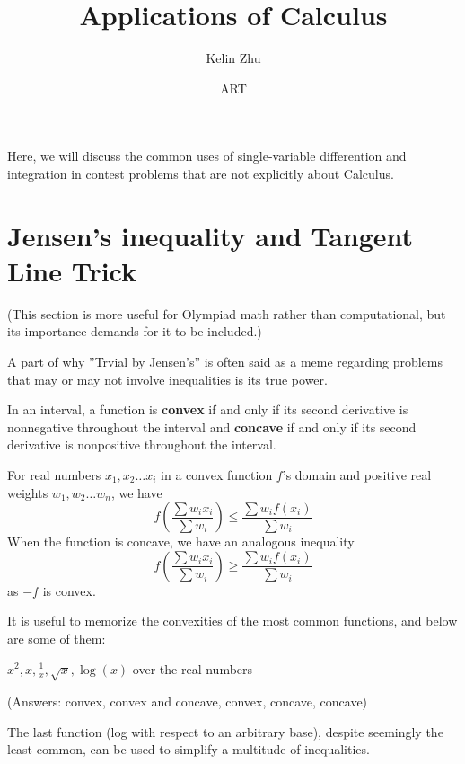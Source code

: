 \documentclass[mast]{lucky}
\title{Applications of Calculus}
\author{Kelin Zhu}
\date{ART}
\begin{document}
\maketitle
Here, we will discuss the common uses of single-variable differention and integration in contest problems that are not explicitly about Calculus.
\section{Jensen's inequality and Tangent Line Trick}
(This section is more useful for Olympiad math rather than computational, but its importance demands for it to be included.)

A part of why ''Trvial by Jensen's'' is often said as a meme regarding problems that may or may not involve inequalities is its true power.
\begin{theo}
In an interval, a function is \textbf{convex} if and only if its second derivative is nonnegative throughout the interval and \textbf{concave} if and only if its second derivative is nonpositive throughout the interval.

For real numbers $x_1,x_2\ldots x_i$ in a convex function $f$'s domain and positive real weights $w_1,w_2\ldots w_n$, we have
$$f\left(\frac{\sum w_i x_i}{\sum w_i}\right)\le \frac{\sum w_i f(x_i)}{\sum w_i}$$
When the function is concave, we have an analogous inequality
$$f\left(\frac{\sum w_i x_i}{\sum w_i}\right)\ge \frac{\sum w_i f(x_i)}{\sum w_i}$$
as $-f$ is convex.
\end{theo}

It is useful to memorize the convexities of the most common functions, and below are some of them:
\begin{exer}
$x^2, x, \frac{1}{x}, \sqrt{x}, \log(x)$ over the real numbers

(Answers: convex, convex and concave, convex, concave, concave)
\end{exer}

The last function (log with respect to an arbitrary base), despite seemingly the least common, can be used to simplify a multitude of inequalities.
\end{document}
